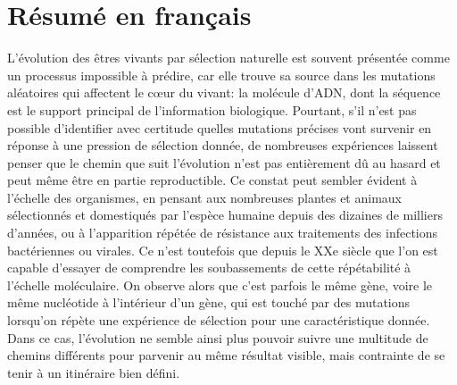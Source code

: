 
\chapter{Résumé en français}

L'évolution des êtres vivants par sélection naturelle est souvent présentée comme un processus impossible à prédire, car elle trouve sa source dans les mutations aléatoires qui affectent le cœur du vivant: la molécule d'ADN, dont la séquence est le support principal de l'information biologique.
Pourtant, s'il n'est pas possible d'identifier avec certitude quelles mutations précises vont survenir en réponse à une pression de sélection donnée, de nombreuses expériences laissent penser que le chemin que suit l'évolution n'est pas entièrement dû au hasard et peut même être en partie reproductible.
Ce constat peut sembler évident à l'échelle des organismes, en pensant aux nombreuses plantes et animaux sélectionnés et domestiqués par l'espèce humaine depuis des dizaines de milliers d'années, ou à l'apparition répétée de résistance aux traitements des infections bactériennes ou virales.
Ce n'est toutefois que depuis le XXe siècle que l'on est capable d'essayer de comprendre les soubassements de cette répétabilité à l'échelle moléculaire.
On observe alors que c'est parfois le même gène, voire le même nucléotide à l'intérieur d'un gène, qui est touché par des mutations lorsqu'on répète une expérience de sélection pour une caractéristique donnée.
Dans ce cas, l'évolution ne semble ainsi plus pouvoir suivre une multitude de chemins différents pour parvenir au même résultat visible, mais contrainte de se tenir à un itinéraire bien défini.

